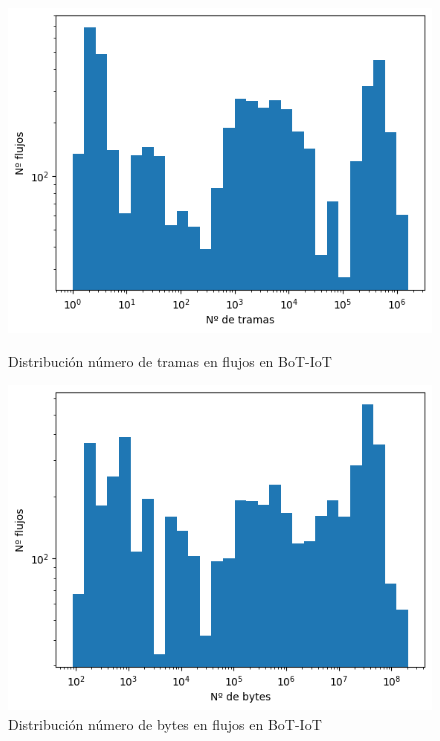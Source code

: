 \begin{figure}[H]
      \includegraphics[width=\linewidth]{media/botiot_pcap_frames_distribution.png}
      \captionsetup{justification=centering}
      \caption{Distribución número de tramas en flujos en BoT-IoT}\label{fig:botiot_pcap_frames_distribution}
    \endminipage\hfill
      \includegraphics[width=\linewidth]{media/botiot_pcap_bytes_distribution.png}
      \captionsetup{justification=centering}
      \caption{Distribución número de bytes en flujos en BoT-IoT}\label{fig:botiot_pcap_bytes_distribution}
    \endminipage\hfill
\end{figure}

